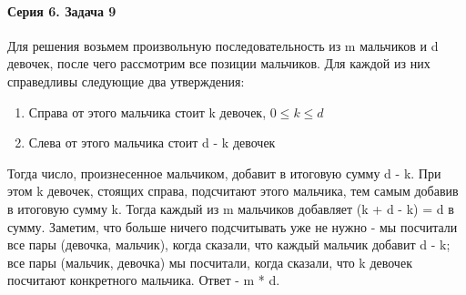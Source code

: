 \documentclass{article}
\begin{document}
	\paragraph{Серия 6. Задача 9}
	\hspace{\fill}
	\newline
	Для решения возьмем произвольную последовательность из m мальчиков и d девочек, после чего рассмотрим все позиции мальчиков. Для каждой из них справедливы следующие два утверждения:
	\begin{enumerate}
		\item Справа от этого мальчика стоит k девочек, $0 \le k \le d$
		\item Слева от этого мальчика стоит d - k девочек
	\end{enumerate}
	Тогда число, произнесенное мальчиком, добавит в итоговую сумму d - k. При этом k девочек, стоящих справа, подсчитают этого мальчика, тем самым добавив в итоговую сумму k. Тогда каждый из m мальчиков добавляет (k + d - k) = d в сумму.
Заметим, что больше ничего подсчитывать уже не нужно - мы посчитали все пары (девочка, мальчик), когда сказали, что каждый мальчик добавит d - k; все пары (мальчик, девочка) мы посчитали, когда сказали, что k девочек посчитают конкретного мальчика.
Ответ - m * d.
\end{document}
